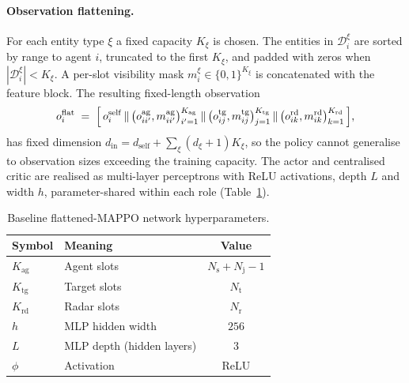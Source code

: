 \paragraph{Observation flattening.}
For each entity type $\xi$ a fixed capacity $K_\xi$ is chosen. The entities
in $\mathcal{D}_i^{\xi}$ are sorted by range to agent $i$, truncated to the
first $K_\xi$, and padded with zeros when
$|\mathcal{D}_i^{\xi}|<K_\xi$. A per-slot visibility mask
$m_i^{\xi}\in\{0,1\}^{K_\xi}$ is concatenated with the feature block. The
resulting fixed-length observation
\begin{equation}
o_i^{\mathrm{flat}} \;=\; \Bigl[\, o_i^{\mathrm{self}} \,\|\,
\bigl(o_{ii'}^{\mathrm{ag}},m_{ii'}^{\mathrm{ag}}\bigr)_{i'=1}^{K_{\mathrm{ag}}} \,\|\,
\bigl(o_{ij}^{\mathrm{tg}},m_{ij}^{\mathrm{tg}}\bigr)_{j=1}^{K_{\mathrm{tg}}} \,\|\,
\bigl(o_{ik}^{\mathrm{rd}},m_{ik}^{\mathrm{rd}}\bigr)_{k=1}^{K_{\mathrm{rd}}} \,\Bigr],
\label{eq:flat_obs}
\end{equation}
has fixed dimension
$d_{\mathrm{in}} = d_{\mathrm{self}} + \sum_{\xi}(d_\xi+1)K_\xi$, so the
policy cannot generalise to observation sizes exceeding the training capacity.
The actor and centralised critic are realised as multi-layer perceptrons with
ReLU activations, depth $L$ and width $h$, parameter-shared within each role
(Table~\ref{tab:baseline_params}).

\begin{table}[H]
\centering
\caption{Baseline flattened-MAPPO network hyperparameters.}
\label{tab:baseline_params}
\begin{tabular}{@{}llc@{}}
\toprule
Symbol & Meaning & Value \\ \midrule
$K_{\mathrm{ag}}$ & Agent slots                & $N_{\mathrm{s}}+N_{\mathrm{j}}-1$ \\
$K_{\mathrm{tg}}$ & Target slots               & $N_{\mathrm{t}}$ \\
$K_{\mathrm{rd}}$ & Radar slots                & $N_{\mathrm{r}}$ \\
$h$               & MLP hidden width           & $256$ \\
$L$               & MLP depth (hidden layers)  & $3$ \\
$\phi$            & Activation                 & ReLU \\
\bottomrule
\end{tabular}
\end{table}


